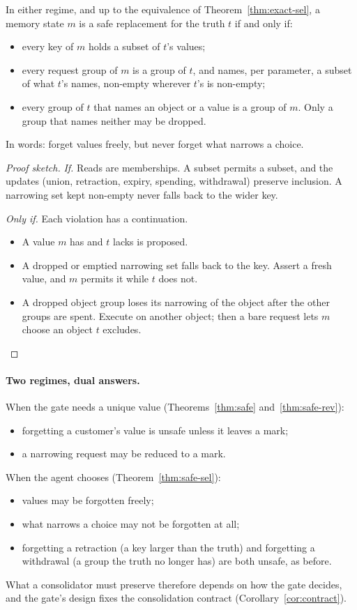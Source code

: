 \begin{theorem}\label{thm:safe-sel}
In either regime, and up to the equivalence of Theorem~\ref{thm:exact-sel}, a memory state $m$ is
a safe replacement for the truth $t$ if and only if:
\begin{itemize}
\item every key of $m$ holds a subset of $t$'s values;
\item every request group of $m$ is a group of $t$, and names, per parameter, a subset of what $t$'s
  names, non-empty wherever $t$'s is non-empty;
\item every group of $t$ that names an object or a value is a group of $m$. Only a group that names
  neither may be dropped.
\end{itemize}
In words: forget values freely, but never forget what narrows a choice.
\end{theorem}
\begin{proof}[Proof sketch]
\emph{If.} Reads are memberships. A subset permits a subset, and the updates (union, retraction,
expiry, spending, withdrawal) preserve inclusion. A narrowing set kept non-empty never falls back
to the wider key.

\emph{Only if.} Each violation has a continuation.
\begin{itemize}
\item A value $m$ has and $t$ lacks is proposed.
\item A dropped or emptied narrowing set falls back to the key. Assert a fresh value, and $m$
  permits it while $t$ does not.
\item A dropped object group loses its narrowing of the object after the other groups are spent.
  Execute on another object; then a bare request lets $m$ choose an object $t$ excludes.
\end{itemize}
\end{proof}

\paragraph{Two regimes, dual answers.} When the gate needs a unique value
(Theorems~\ref{thm:safe} and~\ref{thm:safe-rev}):
\begin{itemize}
\item forgetting a customer's value is unsafe unless it leaves a mark;
\item a narrowing request may be reduced to a mark.
\end{itemize}
When the agent chooses (Theorem~\ref{thm:safe-sel}):
\begin{itemize}
\item values may be forgotten freely;
\item what narrows a choice may not be forgotten at all;
\item forgetting a retraction (a key larger than the truth) and forgetting a withdrawal (a group
  the truth no longer has) are both unsafe, as before.
\end{itemize}
What a consolidator must preserve therefore depends on how the gate decides, and the gate's design
fixes the consolidation contract (Corollary~\ref{cor:contract}).
